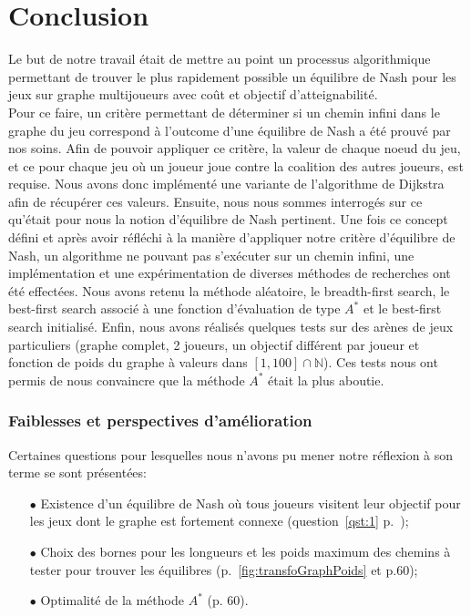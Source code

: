 
\section{Conclusion}

Le but de notre travail était de mettre au point un processus algorithmique permettant de trouver le plus rapidement possible un équilibre de Nash pour les jeux sur graphe multijoueurs avec coût et objectif d'atteignabilité. \\

Pour ce faire, un critère permettant de déterminer si un chemin infini dans le graphe du jeu correspond à l'outcome d'une équilibre de Nash a été prouvé par nos soins. Afin de pouvoir appliquer ce critère, la valeur de chaque noeud du jeu, et ce pour chaque jeu où un joueur joue contre la coalition des autres joueurs, est requise. Nous avons donc implémenté une variante de l'algorithme de Dijkstra afin de récupérer ces valeurs. Ensuite, nous nous sommes interrogés sur ce qu'était pour nous la notion d'équilibre de Nash pertinent. Une fois ce concept défini et après avoir réfléchi à la manière d'appliquer notre critère d'équilibre de Nash, un algorithme ne pouvant pas s'exécuter sur un chemin infini, une implémentation et une expérimentation de diverses méthodes de recherches ont été effectées. Nous avons retenu la méthode aléatoire, le breadth-first search, le best-first search associé à une fonction d'évaluation de type $A^*$ et le best-first search initialisé. Enfin, nous avons réalisés quelques tests sur des arènes de jeux particuliers (graphe complet, 2 joueurs, un objectif différent par joueur et fonction de poids du graphe à valeurs dans $[1, 100] \cap \mathbb{N}$). Ces tests nous ont permis de nous convaincre que la méthode $A^*$ était la plus aboutie.\\

\subsubsection*{Faiblesses et perspectives d'amélioration}

Certaines questions pour lesquelles nous n'avons pu mener notre réflexion à son terme se sont présentées:
\begin{itemize}
	\item[$\bullet$] Existence d'un équilibre de Nash où tous joueurs visitent leur objectif pour les jeux dont le graphe est fortement connexe (question~\ref{qst:1} p.~\pageref{qst:1});
	\item[$\bullet$] Choix des bornes pour les longueurs et les poids maximum des chemins à tester pour trouver les équilibres (p.~\ref{fig:transfoGraphPoids} et p.60);
	\item[$\bullet$] Optimalité de la méthode $A^*$ (p. 60).
\end{itemize}

